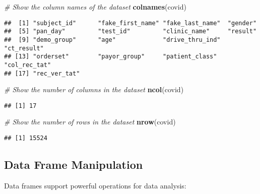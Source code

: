 \documentclass[
]{book}
\newenvironment{Shaded}{\begin{snugshade}}{\end{snugshade}}
\newcommand{\CommentTok}[1]{\textcolor[rgb]{0.56,0.35,0.01}{\textit{#1}}}
\newcommand{\FloatTok}[1]{\textcolor[rgb]{0.00,0.00,0.81}{#1}}
\newcommand{\FunctionTok}[1]{\textcolor[rgb]{0.13,0.29,0.53}{\textbf{#1}}}
\newcommand{\NormalTok}[1]{#1}
\newcommand{\OtherTok}[1]{\textcolor[rgb]{0.56,0.35,0.01}{#1}}
\newcommand{\SpecialCharTok}[1]{\textcolor[rgb]{0.81,0.36,0.00}{\textbf{#1}}}
\begin{document}
\begin{Shaded}
\begin{Highlighting}[]
\CommentTok{\# Show the column names of the dataset}
\FunctionTok{colnames}\NormalTok{(covid)   }
\end{Highlighting}
\end{Shaded}

\begin{verbatim}
##  [1] "subject_id"      "fake_first_name" "fake_last_name"  "gender"         
##  [5] "pan_day"         "test_id"         "clinic_name"     "result"         
##  [9] "demo_group"      "age"             "drive_thru_ind"  "ct_result"      
## [13] "orderset"        "payor_group"     "patient_class"   "col_rec_tat"    
## [17] "rec_ver_tat"
\end{verbatim}

\begin{Shaded}
\begin{Highlighting}[]
\CommentTok{\# Show the number of columns in the dataset}
\FunctionTok{ncol}\NormalTok{(covid)       }
\end{Highlighting}
\end{Shaded}

\begin{verbatim}
## [1] 17
\end{verbatim}

\begin{Shaded}
\begin{Highlighting}[]
\CommentTok{\# Show the number of rows in the dataset}
\FunctionTok{nrow}\NormalTok{(covid)    }
\end{Highlighting}
\end{Shaded}

\begin{verbatim}
## [1] 15524
\end{verbatim}

\subsection{Data Frame Manipulation}\label{data-frame-manipulation}

Data frames support powerful operations for data analysis:

\begin{Shaded}
\end{Shaded}
\end{document}
